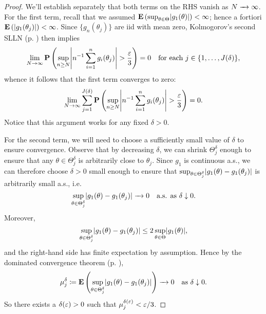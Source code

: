 \documentclass[11pt,letterpaper,reqno,oneside]{article}
\begin{document}
\begin{proof}
	We'll establish separately that both terms on the RHS vanish as $N\conv \infty$. For the first term, recall that we assumed $\E\left( \sup_{\theta \in \Theta} \abs*{g_1(\theta)} \right) < \infty$; hence a fortiori $\E\left( \abs*{g_1(\theta_j)} \right) < \infty$. Since $\{ g_n(\theta_j) \}$ are iid with mean zero, Kolmogorov's second SLLN (p. \pageref{theorem:Kolmogorov_2nd_SLLN}) then implies
	\begin{equation*}
		\lim_{N \to \infty}
		\PP\left(
		\sup_{n \geq N}
		\abs*{ n^{-1} \sum_{i=1}^n g_i(\theta_j) }
		> \frac{\eps}{3}
		\right)
		= 0 
		\quad\text{for each $j \in \{1,\dots,J(\delta)\}$} ,
	\end{equation*}
	whence it follows that the first term converges to zero:
	\begin{equation*}
		\lim_{N \to \infty}
		\sum_{j=1}^{J(\delta)}
		\PP\left(
		\sup_{n \geq N}
		\abs*{ n^{-1} \sum_{i=1}^n g_i(\theta_j) }
		> \frac{\eps}{3}
		\right)
		= 0 .
	\end{equation*}
	Notice that this argument works for any fixed $\delta>0$.


	For the second term, we will need to choose a sufficiently small value of $\delta$ to ensure convergence. Observe that by decreasing $\delta$, we can shrink $\Theta^\delta_j$ enough to ensure that any $\theta \in \Theta^\delta_j$ is arbitrarily close to $\theta_j$. Since $g_1$ is continuous a.s., we can therefore choose $\delta>0$ small enough to ensure that $\sup_{\theta \in \Theta_j^\delta} \abs*{ g_1(\theta) - g_1(\theta_j) }$ is arbitrarily small a.s., i.e.
	\begin{equation*}
		\sup_{\theta \in \Theta_j^\delta} \abs*{ g_1(\theta) - g_1(\theta_j) }
		\conv 0
		\quad\text{a.s. as $\delta \downarrow 0$} .
	\end{equation*}
	Moreover,
	\begin{equation*}
		\sup_{\theta \in \Theta_j^\delta} \abs*{ g_1(\theta) - g_1(\theta_j) } 
		\leq 2 \sup_{\theta \in \Theta} \abs*{g_1(\theta)} ,
	\end{equation*}
	and the right-hand side has finite expectation by assumption. Hence by the dominated convergence theorem (p. \pageref{theorem:dominated_convergence}),
	\begin{equation*}
		\mu^\delta_j \coloneqq
		\E\left( \sup_{\theta \in \Theta_j^\delta} \abs*{ g_1(\theta) - g_1(\theta_j) }
		\right)
		\conv 0
		\quad\text{as $\delta \downarrow 0$} .
	\end{equation*}
	So there exists a $\delta(\eps)>0$ such that $\mu^{\delta(\eps)}_j < \eps/3$.
	


\end{proof}
\end{document}
